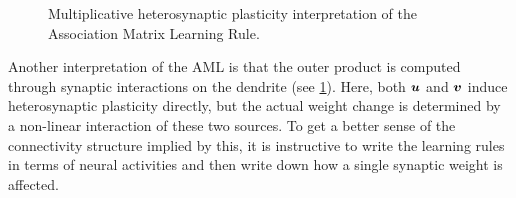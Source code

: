 \begin{figure}
    \centering
    \caption{
        Multiplicative heterosynaptic plasticity interpretation of the Association Matrix Learning Rule.
    }\label{fig:aml-mult-heterosynaptic}
\end{figure}

Another interpretation of the AML is that the outer product is computed through synaptic interactions on the dendrite (see \cref{fig:aml-mult-heterosynaptic}).
Here, both $\bm{u}$ and $\bm{v}$ induce heterosynaptic plasticity directly, but the actual weight change is determined by a non-linear interaction of these two sources.
To get a better sense of the connectivity structure implied by this, it is instructive to write the learning rules in terms of neural activities and then write down how a single synaptic weight is affected.


